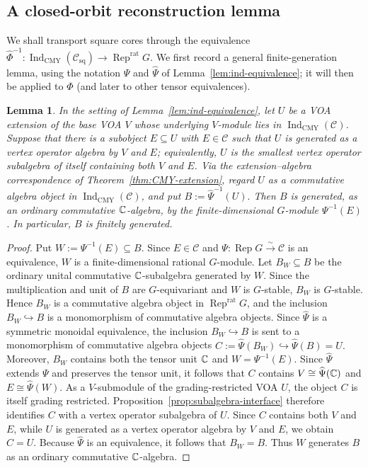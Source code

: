 \documentclass[10pt,a4paper]{amsart}
\numberwithin{equation}{section} \newtheorem{thm}{Theorem}[section] \newtheorem{lem}[thm]{Lemma} \newtheorem{ex}[thm]{Example} \newtheorem{prop}[thm]{Proposition} \newtheorem{cor}[thm]{Corollary} \newtheorem{defi}[thm]{Definition} \newtheorem{rmk}[thm]{Remark} \newtheorem{notation}[thm]{Notation}
\newcommand{\Rep}{\operatorname{Rep}}
\newcommand{\Csq}{\mathcal C_{\mathrm{sq}}}
\newcommand{\IndCMY}{\operatorname{Ind}_{\mathrm{CMY}}}
\begin{document}
\subsection{A closed-orbit reconstruction lemma}

We shall transport square cores through the equivalence \(\widehat\Phi^{-1}:\IndCMY(\Csq)\longrightarrow\Rep^{\mathrm{rat}}G.\) We first record a general finite-generation lemma, using the notation $\Psi$ and $\widehat\Psi$ of Lemma~\ref{lem:ind-equivalence}; it will then be applied to $\Phi$ (and later to other tensor equivalences).

\begin{lem}\label{lem:finite-generation}
In the setting of Lemma~\ref{lem:ind-equivalence}, let $U$ be a VOA extension of the base VOA $V$ whose underlying $V$-module lies in $\IndCMY(\mathcal C)$. Suppose that there is a subobject $E\subseteq U$ with $E\in\mathcal C$ such that $U$ is generated as a vertex operator algebra by $V$ and $E$; equivalently, $U$ is the smallest vertex operator subalgebra of itself containing both $V$ and $E$. Via the extension--algebra correspondence of Theorem~\ref{thm:CMY-extension}, regard $U$ as a commutative algebra object in $\IndCMY(\mathcal C)$, and put $ B:=\widehat\Psi^{-1}(U). $ Then $B$ is generated, as an ordinary commutative $\mathbb{C}$-algebra, by the finite-dimensional $G$-module $\Psi^{-1}(E)$. In particular, $B$ is finitely generated.
\end{lem}

\begin{proof}
Put $W:=\Psi^{-1}(E)\subseteq B$. Since $E\in\mathcal C$ and $\Psi:\Rep G\overset{\sim}{\longrightarrow}\mathcal C$ is an equivalence, $W$ is a finite-dimensional rational $G$-module. Let $B_W\subseteq B$ be the ordinary unital commutative $\mathbb{C}$-subalgebra generated by $W$. Since the multiplication and unit of $B$ are $G$-equivariant and $W$ is $G$-stable, $B_W$ is $G$-stable. Hence \(B_W\) is a commutative algebra object in \(\Rep^{\mathrm{rat}}G\), and the inclusion $ B_W\hookrightarrow B $ is a monomorphism of commutative algebra objects. Since \(\widehat\Psi\) is a symmetric monoidal equivalence, the inclusion \(B_W\hookrightarrow B\) is sent to a monomorphism of commutative algebra objects $ C:=\widehat\Psi(B_W)\hookrightarrow \widehat\Psi(B)=U. $ Moreover, \(B_W\) contains both the tensor unit \(\mathbb{C}\) and \(W=\Psi^{-1}(E)\). Since \(\widehat\Psi\) extends \(\Psi\) and preserves the tensor unit, it follows that \(C\) contains \(V\cong\widehat\Psi(\mathbb{C})\) and \(E\cong\widehat\Psi(W)\). As a $V$-submodule of the grading-restricted VOA $U$, the object $C$ is itself grading restricted. Proposition~\ref{prop:subalgebra-interface} therefore identifies $C$ with a vertex operator subalgebra of $U$. Since $C$ contains both $V$ and $E$, while $U$ is generated as a vertex operator algebra by $V$ and $E$, we obtain $C=U$. Because $\widehat\Psi$ is an equivalence, it follows that $B_W=B$. Thus $W$ generates $B$ as an ordinary commutative $\mathbb{C}$-algebra.
\end{proof}
\end{document}

